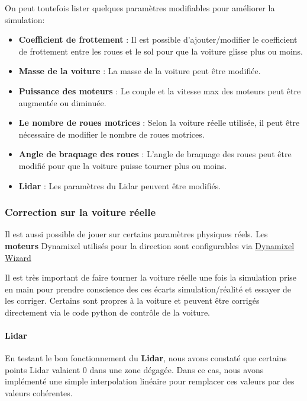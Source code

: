 \documentclass[french]{article}
\begin{document}
On peut toutefois lister quelques paramètres modifiables pour améliorer la simulation:
\begin{itemize}
    \item \textbf{Coefficient de frottement} : Il est possible d'ajouter/modifier le coefficient de frottement entre les roues et le sol pour que la voiture glisse plus ou moins.
    \item \textbf{Masse de la voiture} : La masse de la voiture peut être modifiée.
    \item \textbf{Puissance des moteurs} : Le couple et la vitesse max des moteurs peut être augmentée ou diminuée.
    \item \textbf{Le nombre de roues motrices} : Selon la voiture réelle utilisée, il peut être nécessaire de modifier le nombre de roues motrices.
    \item \textbf{Angle de braquage des roues} : L'angle de braquage des roues peut être modifié pour que la voiture puisse tourner plus ou moins.
    \item \textbf{Lidar} : Les paramètres du Lidar peuvent être modifiés.
\end{itemize} 

\subsubsection{Correction sur la voiture réelle} \vspace{0.5cm}

Il est aussi possible de jouer sur certains paramètres physiques réels. Les \textbf{moteurs} Dynamixel utilisés pour la direction sont configurables via \href{https://emanual.robotis.com/docs/en/software/dynamixel/dynamixel_wizard2/}{Dynamixel Wizard}
\vspace{0.5cm}

Il est très important de faire tourner la voiture réelle une fois la simulation prise en main pour prendre conscience des ces écarts simulation/réalité et essayer de les corriger. Certains sont propres à la voiture et peuvent être corrigés directement via le code python de contrôle de la voiture. 

\vspace{0.5cm}

\paragraph{Lidar}
En testant le bon fonctionnement du \textbf{Lidar}, nous avons constaté que certains points Lidar valaient 0 dans une zone dégagée. Dans ce cas, nous avons implémenté une simple interpolation linéaire pour remplacer ces valeurs par des valeurs cohérentes.
\end{document}
